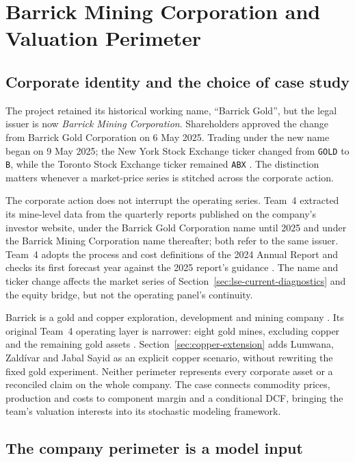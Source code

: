 \chapter{Barrick Mining Corporation and Valuation Perimeter}
\label{ch:company}

\section{Corporate identity and the choice of case study}
\label{sec:company-identity}

The project retained its historical working name, ``Barrick Gold'', but the
legal issuer is now \emph{Barrick Mining Corporation}. Shareholders approved
the change from Barrick Gold Corporation on 6 May 2025. Trading under the new
name began on 9 May 2025; the New York Stock Exchange ticker changed from
\texttt{GOLD} to \texttt{B}, while the Toronto Stock Exchange ticker remained
\texttt{ABX} \cite{barrick-name-2025}. The distinction matters whenever a
market-price series is stitched across the corporate action.

The corporate action does not interrupt the operating series. Team~4 extracted
its mine-level data from the quarterly reports published on the company's
investor website, under the Barrick Gold Corporation name until 2025 and under
the Barrick Mining Corporation name thereafter; both refer to the same issuer.
Team~4 adopts the process and cost definitions of the 2024 Annual Report and
checks its first forecast year against the 2025 report's guidance
\cite{team4,barrick-ar-2025}. The name and ticker change affects the market
series of Section~\ref{sec:lse-current-diagnostics} and the equity bridge,
but not the operating panel's continuity.

Barrick is a gold and copper exploration, development and mining company
\cite{barrick-about-2026}. Its original Team~4 operating layer is narrower:
eight gold mines, excluding copper and the remaining gold assets \cite{team4}.
Section~\ref{sec:copper-extension} adds Lumwana, Zald\'ivar and Jabal Sayid as
an explicit copper scenario, without rewriting the fixed gold experiment.
Neither perimeter represents every corporate asset or a reconciled claim on
the whole company. The case connects commodity prices, production and costs
to component margin and a conditional DCF, bringing the team's valuation
interests into its stochastic modeling framework.

\section{The company perimeter is a model input}
\label{sec:company-perimeter}

